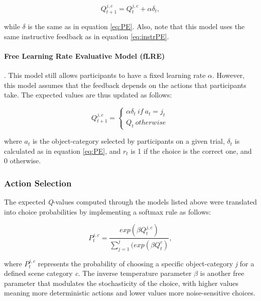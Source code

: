 \documentclass[a4paper,12pt]{article}
\begin{document}
\begin{equation}
{Q}_{t+1}^{j,c} = {Q}_{t}^{j,c}  + {\alpha} \delta_{t},
\label{eq:fLRI}
\end{equation}

\noindent
while $\delta$ is the same as in equation \ref{eq:PE}. Also, note that this model uses the same instructive feedback as in equation \ref{eq:instrPE}.

\paragraph{Free Learning Rate Evaluative Model (fLRE)}. This model still allows participants to have a fixed learning rate $\alpha$. However, this model assumes that the feedback depends on the actions that participants take. The expected values are thus updated as follows:


\begin{equation}
{Q}_{t+1}^{j,c} = \begin{cases}
{\alpha} \delta_{t}\ if  \ a_t = j_t \  \\ 
{Q}_{t} \ otherwise
\end{cases}
\end{equation}

\noindent
where $a_t$ is the object-category selected by participants on a given trial, $\delta_{t}$ is calculated as in equation \ref{eq:PE}, and $r_t$ is 1 if the choice is the correct one, and 0 otherwise. 

\subsubsection{Action Selection} The expected \textit{Q}-values computed through the models listed above were translated into choice probabilities by implementing a softmax rule as follows: 

\begin{equation}
P_t^{j,c} = \dfrac{ exp({\beta} {Q}_t^{j,c})   }
{ \sum_{j=1}^j (exp({\beta} {Q}_t^c) },  
\end{equation}

\noindent
where $P_t^{j,c}$ represents the probability of choosing a specific object-category \textit{j} for a defined scene category \textit{c}. The inverse temperature parameter $\beta$ is another free parameter that modulates the stochasticity of the choice, with higher values meaning more deterministic actions and lower values more noise-sensitive choices. 
\end{document}

